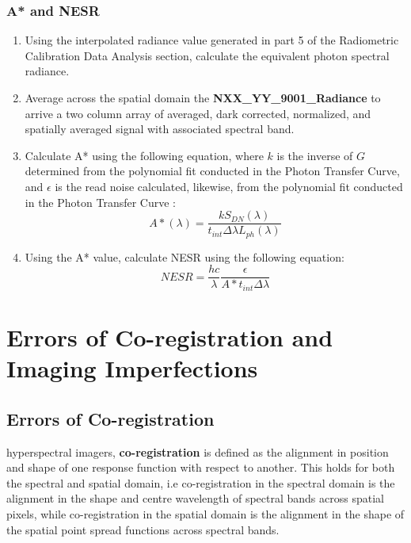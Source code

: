 \documentclass[nohyper,nobib]{tufte-book}
\begin{document}
\section{A* and NESR}
\begin{enumerate}
	\item Using the interpolated radiance value generated in part 5 of the Radiometric Calibration Data Analysis section, calculate the equivalent photon spectral radiance.
	\item Average across the spatial domain the \textbf{NXX\_YY\_9001\_Radiance} to arrive a two column array of averaged, dark corrected, normalized, and spatially averaged signal with associated spectral band. 
	\item Calculate A* using the following equation, where $k$ is the inverse of $G$ determined from the polynomial fit conducted in the Photon Transfer Curve, and $\epsilon$ is the read noise calculated, likewise, from the polynomial fit conducted in the Photon Transfer Curve :
		\begin{equation}
			A* (\lambda) = \frac{k S_{DN}(\lambda)}{t_{int} \Delta\lambda L_{ph}(\lambda)}
		\end{equation}
	\item Using the A* value, calculate NESR using the following equation:
	\begin{equation}
		NESR = \frac{hc}{\lambda} \frac{ \epsilon}{A* t_{int} \Delta\lambda}
	\end{equation}	
\end{enumerate}


\part{Errors of Co-registration and Imaging Imperfections}

\chapter{Errors of Co-registration}
\label{ch:coregerrors}

 hyperspectral imagers, \textbf{co-registration} is defined as the alignment in position and shape of one response function with respect to another. This holds for both the spectral and spatial domain, i.e co-registration in the spectral domain is the alignment in the shape and centre wavelength of spectral bands across spatial pixels, while co-registration in the spatial domain is the alignment in the shape of the spatial point spread functions across spectral bands. 
\end{document}
